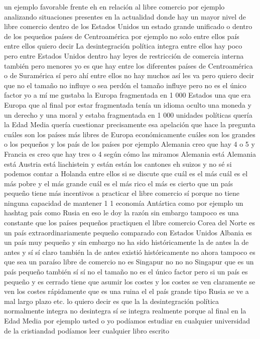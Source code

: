 un ejemplo favorable frente eh en relación al libre comercio por ejemplo analizando situaciones presentes en la actualidad
donde hay un mayor nivel de libre comercio dentro de los Estados Unidos un estado grande unificado o dentro de los pequeños países de Centroamérica
por ejemplo no solo entre ellos país entre ellos quiero decir
La desintegración política integra
entre ellos hay poco pero entre Estados Unidos dentro hay leyes de restricción de comercia interna también
pero menores yo es que hay entre los diferentes países de Centroamérica o de Suramérica sí
pero ahí entre ellos no hay muchos así les va pero quiero decir que no
el tamaño no influye o sea perdón el tamaño influye pero no es el único factor
yo a mí me gustaba la Europa fragmentada en 1 000 Estados una que era Europa que al final por estar fragmentada tenía un idioma oculto
una moneda y un derecho y una moral y estaba fragmentada en 1 000 unidades políticas
quería la Edad Media quería cuestionar precisamente esa apelación que hace la pregunta cuáles son los países más libres de Europa
económicamente cuáles son los grandes o los pequeños y los país de los países por ejemplo Alemania creo que hay 4 o 5
y Francia es creo que hay tres o 4 según cómo las miramos Alemania está Alemania está Austria está liachistein
y están están los cantones eh suizos y no sé si podemos contar a Holanda entre ellos
si se discute que cuál es el más cuál es el más pobre y el más grande cuál es el más rico el más es cierto que un país pequeño
tiene más incentivos a practicar el libre comercio sí porque no tiene ninguna capacidad de mantener 1 1 economía Antártica
como por ejemplo un hashtag país como Rusia en eso le doy la razón sin embargo tampoco es una constante
que los países pequeños practiquen el libre comercio Corea del Norte es un país extraordinariamente pequeño comparado con Estados Unidos
Albania es un país muy pequeño y sin embargo no ha sido históricamente la de antes la de antes
y sí sí claro también la de antes existió históricamente no ahora tampoco es que sea un paraíso libre de comercio
no es Singapur no no no Singapur que es un país pequeño también sí sí no
el tamaño no es el único factor pero si un país es pequeño y es cerrado
tiene que asumir los costes y los costes se ven claramente se ven los costes rápidamente que es una ruina el el país grande tipo Rusia
se ve a mal largo plazo etc. lo quiero decir es que la la desintegración política normalmente
integra no desintegra sí se integra realmente porque al final
en la Edad Media por ejemplo usted o yo podíamos estudiar en cualquier universidad de la cristiandad podíamos leer cualquier libro escrito
